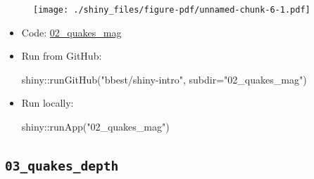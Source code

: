 \documentclass[
  letterpaper,
  DIV=11,
  numbers=noendperiod]{scrreprt}
\newenvironment{Shaded}{\begin{snugshade}}{\end{snugshade}}
\newcommand{\AttributeTok}[1]{\textcolor[rgb]{0.40,0.45,0.13}{#1}}
\newcommand{\FunctionTok}[1]{\textcolor[rgb]{0.28,0.35,0.67}{#1}}
\newcommand{\NormalTok}[1]{\textcolor[rgb]{0.00,0.23,0.31}{#1}}
\newcommand{\SpecialCharTok}[1]{\textcolor[rgb]{0.37,0.37,0.37}{#1}}
\newcommand{\StringTok}[1]{\textcolor[rgb]{0.13,0.47,0.30}{#1}}
\begin{document}
\begin{figure}[H]

{\centering \texttt{[image: ./shiny\_files/figure-pdf/unnamed-chunk-6-1.pdf]}

}

\end{figure}

\begin{itemize}
\item
  Code:
  \href{https://github.com/bbest/shiny-intro/tree/master/02_quakes_mag}{02\_quakes\_mag}
\item
  Run from GitHub:

\begin{Shaded}
\begin{Highlighting}[]
\NormalTok{shiny}\SpecialCharTok{::}\FunctionTok{runGitHub}\NormalTok{(}\StringTok{"bbest/shiny{-}intro"}\NormalTok{, }\AttributeTok{subdir=}\StringTok{"02\_quakes\_mag"}\NormalTok{)}
\end{Highlighting}
\end{Shaded}
\item
  Run locally:

\begin{Shaded}
\begin{Highlighting}[]
\NormalTok{shiny}\SpecialCharTok{::}\FunctionTok{runApp}\NormalTok{(}\StringTok{"02\_quakes\_mag"}\NormalTok{)}
\end{Highlighting}
\end{Shaded}
\end{itemize}

\hypertarget{quakes_depth}{%
\subsection{\texorpdfstring{\texttt{03\_quakes\_depth}}{03\_quakes\_depth}}\label{quakes_depth}}
\end{document}

